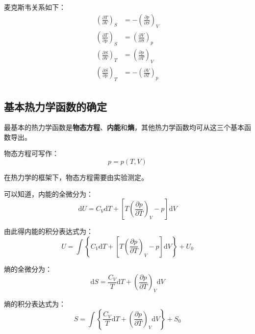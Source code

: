 \documentclass[UTF8]{ctexart}
\newcommand{\dif}{\mathrm{d}}
\begin{document}
	麦克斯韦关系如下：
	\begin{equation}
	\begin{aligned}
	\left(\frac{\partial T}{\partial V}\right)_{S} &= - \left(\frac{\partial p}{\partial S}\right)_{V} \\
	\left(\frac{\partial T}{\partial p}\right)_{S} &=\left(\frac{\partial V}{\partial S}\right)_{p} \\
	\left(\frac{\partial S}{\partial V}\right)_{T} &=\left(\frac{\partial p}{\partial T}\right)_{V} \\
	\left(\frac{\partial S}{\partial p}\right)_{T} &= - \left(\frac{\partial V}{\partial T}\right)_{p} \\
	\end{aligned}
	\end{equation}
	
	\subsection{基本热力学函数的确定}
	最基本的热力学函数是\textbf{物态方程}、\textbf{内能}和\textbf{熵}，其他热力学函数均可从这三个基本函数导出。
	
	物态方程可写作：
	\begin{equation}
		p = p(T, V)
	\end{equation}
	
\noindent 在热力学的框架下，物态方程需要由实验测定。

	可以知道，内能的全微分为：
	\begin{equation}
		\dif U =C_{V} \dif T+\left[T\left(\frac{\partial p}{\partial T}\right)_{V}-p\right] \dif V
	\end{equation}
	
\noindent 由此得内能的积分表达式为：
\begin{equation}
	U=\int\left\{C_{V} \dif T+\left[T\left(\frac{\partial p}{\partial T}\right)_{V}-p\right] \dif V\right\} + U_{0}
\end{equation}

	熵的全微分为：
	\begin{equation}
		\dif S = \frac{C_{V}}{T} \dif T+\left(\frac{\partial p}{\partial T}\right)_{V} \dif V
	\end{equation}
	
\noindent 熵的积分表达式为：
\begin{equation}
	S=\int\left\{\frac{C_{V}}{T} \dif T+\left(\frac{\partial p}{\partial T}\right)_{V} \dif V\right\} + S_{0}
\end{equation}
\end{document}
